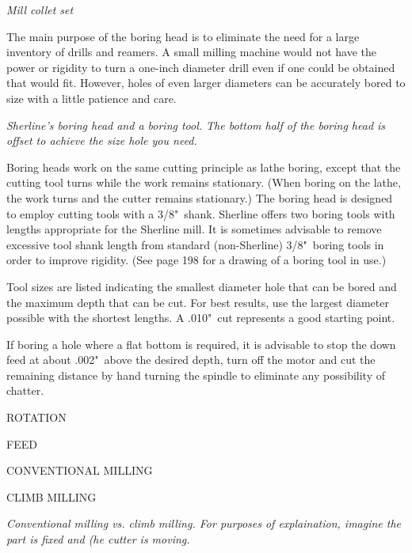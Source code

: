 \bigskip
\textit{Mill collet set}
\bigskip


The main purpose of the boring head is to eliminate the need for a large
inventory of drills and reamers. A small milling machine would not have the
power or rigidity to turn a one-inch diameter drill even if one could be
obtained that would fit. However, holes of even larger diameters can be
accurately bored to size with a little patience and care.


\bigskip
\textit{Sherline's boring head and a boring tool. The bottom half of the boring
head is offset to achieve the size hole you need.}
\bigskip

Boring heads work on the same cutting principle as lathe boring, except that the
cutting tool turns while the work remains stationary. (When boring on the lathe,
the work turns and the cutter remains stationary.) The boring head is designed
to employ cutting tools with a 3/8"\ shank. Sherline offers two boring tools with
lengths appropriate for the Sherline mill. It is sometimes advisable to remove
excessive tool shank length from standard (non-Sherline) 3/8"\ boring tools in
order to improve rigidity. (See page 198 for a drawing of a boring tool in use.)

Tool sizes are listed indicating the smallest diameter hole that can be bored
and the maximum depth that can be cut. For best results, use the largest
diameter possible with the shortest lengths. A .010"\ cut represents a good
starting point.

If boring a hole where a flat bottom is required, it is advisable to stop the
down feed at about .002"\ above the desired depth, turn off the motor and cut
the remaining distance by hand turning the spindle to eliminate any possibility
of chatter.

\secup

\secdown

\bigskip
ROTATION

FEED

CONVENTIONAL MILLING

CLIMB MILLING
\bigskip

\textit{Conventional milling vs. climb milling. For purposes of explaination,
imagine the part is fixed and (he cutter is moving.}
\bigskip


